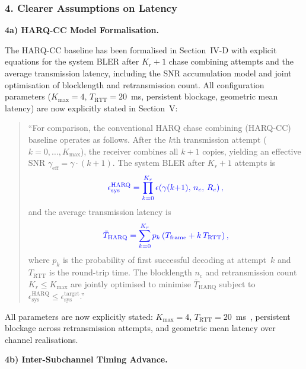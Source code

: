 \subsubsection*{4. Clearer Assumptions on Latency}

\noindent\textbf{4a) HARQ-CC Model Formalisation.}

The HARQ-CC baseline has been formalised in Section~IV-D with explicit equations for the system BLER after $K_r+1$ chase combining attempts and the average transmission latency, including the SNR accumulation model and joint optimisation of blocklength and retransmission count. All configuration parameters ($K_{\max} = 4$, $T_{\mathrm{RTT}} = 20$~ms, persistent blockage, geometric mean latency) are now explicitly stated in Section~V:

\begin{quote}
``{\color{blue}For comparison, the conventional HARQ chase combining
(HARQ-CC) baseline operates as follows. After the $k$th
transmission attempt ($k = 0,\ldots,K_{\max}$), the receiver
combines all $k+1$ copies, yielding an effective SNR
$\gamma_{\mathrm{eff}} = \gamma \cdot (k+1)$.
The system BLER after $K_r+1$ attempts is}
\begin{equation*}
\color{blue}
\epsilon_{\mathrm{sys}}^{\mathrm{HARQ}} =
\prod_{k=0}^{K_r} \epsilon\!\left(\gamma(k{+}1),\, n_c,\, R_c\right),
\end{equation*}
{\color{blue}and the average transmission latency is}
\begin{equation*}
\color{blue}
\bar{T}_{\mathrm{HARQ}} = \sum_{k=0}^{K_r} p_k
\left(T_{\mathrm{frame}} + k\,T_{\mathrm{RTT}}\right),
\end{equation*}
{\color{blue}where $p_k$ is the probability of first successful decoding at
attempt~$k$ and $T_{\mathrm{RTT}}$ is the round-trip time.
The blocklength $n_c$ and retransmission count
$K_r \leq K_{\max}$ are jointly optimised to minimise
$\bar{T}_{\mathrm{HARQ}}$ subject to
$\epsilon_{\mathrm{sys}}^{\mathrm{HARQ}} \leq
\epsilon_{\mathrm{sys}}^{\mathrm{target}}$.}''
\end{quote}

All parameters are now explicitly stated: $K_{\max} = 4$, $T_{\mathrm{RTT}} = 20$~ms~\cite{3GPP38821}, persistent blockage across retransmission attempts, and geometric mean latency over channel realisations.

\vskip 0.1in
\noindent\textbf{4b) Inter-Subchannel Timing Advance.}


